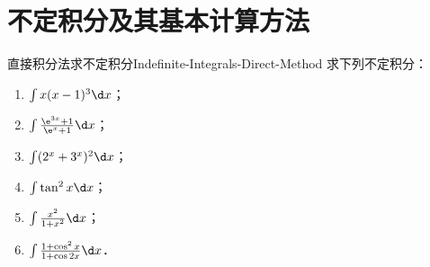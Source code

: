 \section{不定积分及其基本计算方法}

\begin{problem}{直接积分法求不定积分}{Indefinite-Integrals-Direct-Method}
    求下列不定积分：
    \begin{enumerate}
        \item $\int x(x - 1)^3 \d x$；
        \item $\int \frac{\e^{3x} + 1}{\e^x + 1} \d x$；
        \item $\int (2^x + 3^x)^2 \d x$；
        \item $\int \tan^2 x \d x$；
        \item $\int \frac{x^2}{1 + x^2} \d x$；
        \item $\int \frac{1 + \cos^2 x}{1 + \cos 2x} \d x$．
    \end{enumerate}
\end{problem}

